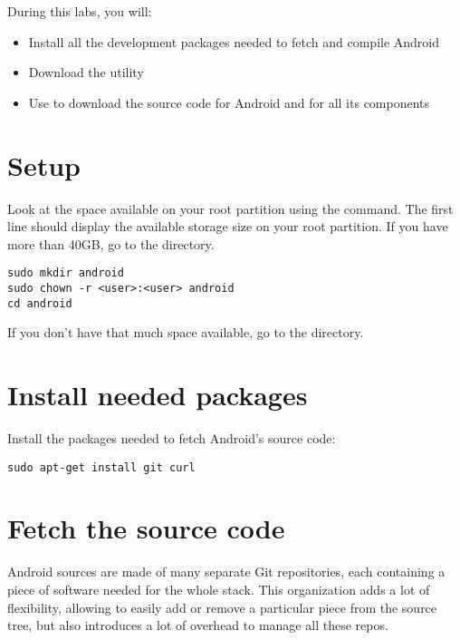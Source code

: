 
During this labs, you will:
\begin{itemize}
  \item Install all the development packages needed to fetch and compile Android
  \item Download the  utility
  \item Use  to download the source code for Android
        and for all its components 
\end{itemize}

\section{Setup}

Look at the space available on your root partition using the
 command. The first line should display the available
storage size on your root partition. If you have more than 40GB, go to
the  directory.

\begin{verbatim}
sudo mkdir android
sudo chown -r <user>:<user> android
cd android
\end{verbatim}

If you don't have that much space available, go to the
 directory.

\section{Install needed packages}

Install the packages needed to fetch Android's source code:

\begin{verbatim}
sudo apt-get install git curl
\end{verbatim}

\section{Fetch the source code}

Android sources are made of many separate Git repositories, each
containing a piece of software needed for the whole stack. This
organization adds a lot of flexibility, allowing to easily add or
remove a particular piece from the source tree, but also introduces a
lot of overhead to manage all these repos.

